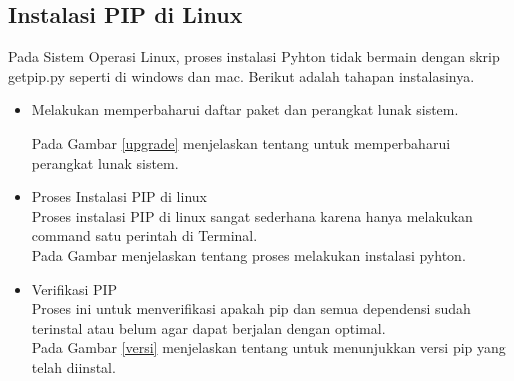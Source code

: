 \subsection{Instalasi PIP di Linux}
Pada Sistem Operasi Linux, proses instalasi Pyhton tidak bermain dengan skrip getpip.py seperti di windows dan mac. Berikut adalah tahapan instalasinya.
\begin{itemize}
\item Melakukan memperbaharui daftar paket dan perangkat lunak sistem.

Pada Gambar \ref{upgrade} menjelaskan tentang untuk memperbaharui perangkat lunak sistem.
\item Proses Instalasi PIP di linux \\
Proses instalasi PIP di linux sangat sederhana karena hanya melakukan command satu perintah di Terminal.\\
Pada Gambar menjelaskan tentang proses melakukan instalasi pyhton.
\item Verifikasi PIP \\
Proses ini untuk menverifikasi apakah pip dan semua dependensi sudah terinstal atau belum agar dapat berjalan dengan optimal.\\

Pada Gambar \ref{versi} menjelaskan tentang untuk menunjukkan versi pip yang telah diinstal.

\end{itemize}
